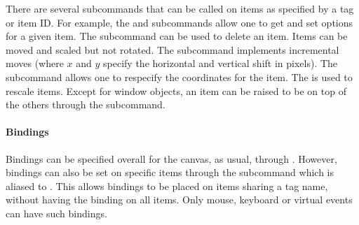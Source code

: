 There are several subcommands that can be called on items as specified
by a tag or item ID. For example, the 
and  subcommands allow one to get
and set options for a given item. The
 subcommand can be used to
delete an item. Items can be moved and scaled but not rotated. The
 subcommand implements
incremental moves (where $x$ and $y$ specify the horizontal and
vertical shift in pixels). The subcommand
 allows one
to respecify the coordinates for the item. The
 is used to rescale items. Except for
window objects, an item can be raised to be on top of the others
through the  subcommand.



\paragraph{Bindings}
Bindings can be specified overall for the canvas, as usual, through
. However, bindings can also be set on specific items
through the subcommand  which is aliased to . This allows
bindings to be placed on items sharing a tag name, without having the
binding on all items. Only mouse, keyboard or virtual events can have
such bindings.

